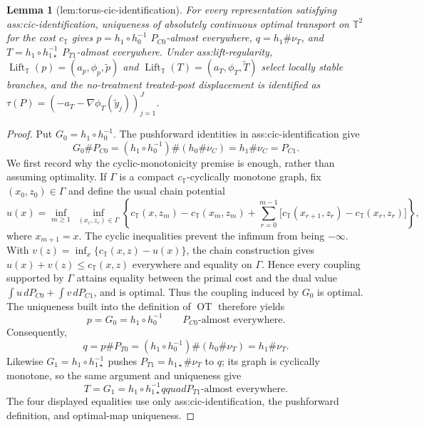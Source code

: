 \documentclass{article}
\newtheorem{lemma}{Lemma}
\begin{document}
\begin{lemma}[lem:torus-cic-identification]\label{lem:torus-cic-identification}
For every representation satisfying ass:cic-identification, uniqueness of absolutely continuous optimal transport on \(\mathbb T^2\) for the cost \(c_{\mathbb T}\) gives \(p=h_1\circ h_0^{-1}\) \(P_{C0}\)-almost everywhere, \(q=h_1\#\nu_T\), and \(T=h_1\circ h_{1\star}^{-1}\) \(P_{T1}\)-almost everywhere. Under ass:lift-regularity, \(\operatorname{Lift}_{\mathbb T}(p)=(a_p,\phi_p,\widetilde p)\) and \(\operatorname{Lift}_{\mathbb T}(T)=(a_T,\phi_T,\widetilde T)\) select locally stable branches, and the no-treatment treated-post displacement is identified as \(\tau(P)=(-a_T-\nabla\phi_T(\widetilde y_j))_{j=1}^J\).
\end{lemma}
\begin{proof}
Put \(G_0=h_1\circ h_0^{-1}\).  The pushforward identities in ass:cic-identification give
\[
G_0\#P_{C0}=(h_1\circ h_0^{-1})\#(h_0\#\nu_C)=h_1\#\nu_C=P_{C1}.
\]
We first record why the cyclic-monotonicity premise is enough, rather than assuming optimality.  If \(\Gamma\) is a compact \(c_{\mathbb T}\)-cyclically monotone graph, fix \((x_0,z_0)\in\Gamma\) and define the usual chain potential
\[
u(x)=\inf_{m\geq 1}\ \inf_{(x_r,z_r)\in\Gamma}
 \left\{c_{\mathbb T}(x,z_m)-c_{\mathbb T}(x_m,z_m)
 +\sum_{r=0}^{m-1}\bigl[c_{\mathbb T}(x_{r+1},z_r)-c_{\mathbb T}(x_r,z_r)\bigr]\right\},
\]
where \(x_{m+1}=x\).  The cyclic inequalities prevent the infimum from being \(-\infty\).  With
\(v(z)=\inf_x\{c_{\mathbb T}(x,z)-u(x)\}\), the chain construction gives
\(u(x)+v(z)\leq c_{\mathbb T}(x,z)\) everywhere and equality on \(\Gamma\).  Hence every coupling supported by \(\Gamma\) attains equality between the primal cost and the dual value \(\int u\,dP_{C0}+\int v\,dP_{C1}\), and is optimal.  Thus the coupling induced by \(G_0\) is optimal.  The uniqueness built into the definition of \(\operatorname{OT}\) therefore yields
\[
p=G_0=h_1\circ h_0^{-1}\qquad P_{C0}\text{-almost everywhere}.
\]
Consequently,
\[
q=p\#P_{T0}=(h_1\circ h_0^{-1})\#(h_0\#\nu_T)=h_1\#\nu_T.
\]
Likewise \(G_1=h_1\circ h_{1\star}^{-1}\) pushes \(P_{T1}=h_{1\star}\#\nu_T\) to \(q\); its graph is cyclically monotone, so the same argument and uniqueness give
\[
T=G_1=h_1\circ h_{1\star}^{-1}qquad P_{T1}\text{-almost everywhere}.
\]
The four displayed equalities use only ass:cic-identification, the pushforward definition, and optimal-map uniqueness.


\end{proof}
\end{document}
